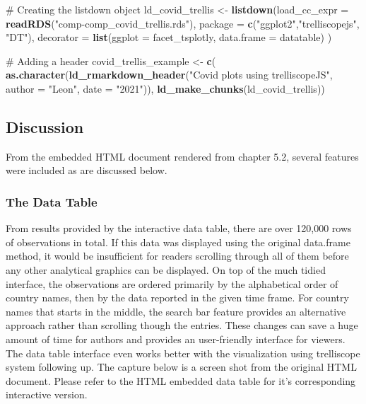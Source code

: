 \documentclass[
]{article}
\newenvironment{Shaded}{\begin{snugshade}}{\end{snugshade}}
\newcommand{\CommentTok}[1]{\textcolor[rgb]{0.54,0.53,0.53}{#1}}
\newcommand{\DataTypeTok}[1]{\textcolor[rgb]{0.00,0.34,0.68}{#1}}
\newcommand{\KeywordTok}[1]{\textcolor[rgb]{0.12,0.11,0.11}{\textbf{#1}}}
\newcommand{\NormalTok}[1]{\textcolor[rgb]{0.12,0.11,0.11}{#1}}
\newcommand{\StringTok}[1]{\textcolor[rgb]{0.75,0.01,0.01}{#1}}
\begin{document}
\begin{Shaded}
\begin{Highlighting}[]
\CommentTok{\# Creating the listdown object}
\NormalTok{ld\_covid\_trellis \textless{}{-}}
\StringTok{  }\KeywordTok{listdown}\NormalTok{(}\DataTypeTok{load\_cc\_expr =} \KeywordTok{readRDS}\NormalTok{(}\StringTok{"comp{-}comp\_covid\_trellis.rds"}\NormalTok{),}
                \DataTypeTok{package =} \KeywordTok{c}\NormalTok{(}\StringTok{"ggplot2"}\NormalTok{,}\StringTok{"trelliscopejs"}\NormalTok{, }\StringTok{"DT"}\NormalTok{),}
              \DataTypeTok{decorator =} \KeywordTok{list}\NormalTok{(}\DataTypeTok{ggplot =}\NormalTok{ facet\_tsplotly, }
                               \DataTypeTok{data.frame =}\NormalTok{ datatable)}
\NormalTok{)}

\CommentTok{\# Adding a header}
\NormalTok{covid\_trellis\_example \textless{}{-}}\StringTok{ }\KeywordTok{c}\NormalTok{(}
 \KeywordTok{as.character}\NormalTok{(}\KeywordTok{ld\_rmarkdown\_header}\NormalTok{(}\StringTok{"Covid plots using trelliscopeJS"}\NormalTok{, }\DataTypeTok{author =} \StringTok{"Leon"}\NormalTok{,}
              \DataTypeTok{date =} \StringTok{"2021"}\NormalTok{)), }\KeywordTok{ld\_make\_chunks}\NormalTok{(ld\_covid\_trellis))}
\end{Highlighting}
\end{Shaded}

\hypertarget{discussion}{%
\subsection{Discussion}\label{discussion}}

From the embedded HTML document rendered from chapter 5.2, several
features were included as are discussed below.

\hypertarget{the-data-table}{%
\subsubsection{The Data Table}\label{the-data-table}}

From results provided by the interactive data table, there are over
120,000 rows of observations in total. If this data was displayed using
the original data.frame method, it would be insufficient for readers
scrolling through all of them before any other analytical graphics can
be displayed. On top of the much tidied interface, the observations are
ordered primarily by the alphabetical order of country names, then by
the data reported in the given time frame. For country names that starts
in the middle, the search bar feature provides an alternative approach
rather than scrolling though the entries. These changes can save a huge
amount of time for authors and provides an user-friendly interface for
viewers. The data table interface even works better with the
visualization using trelliscope system following up. The capture below
is a screen shot from the original HTML document. Please refer to the
HTML embedded data table for it's corresponding interactive version.
\end{document}
